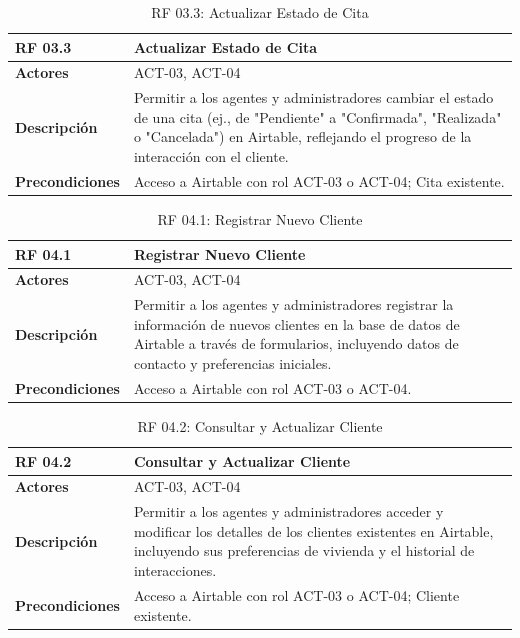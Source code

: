\begin{table}[H]
\centering
\begin{tabular}{|p{3cm}|p{10cm}|}
\hline
\rowcolor{tealblue}
\textbf{RF 03.3} & \textbf{Actualizar Estado de Cita} \\
\hline
\textbf{Actores} & ACT-03, ACT-04 \\
\hline
\textbf{Descripción} & Permitir a los agentes y administradores cambiar el estado de una cita (ej., de "Pendiente" a "Confirmada", "Realizada" o "Cancelada") en Airtable, reflejando el progreso de la interacción con el cliente. \\
\hline
\textbf{Precondiciones} & Acceso a Airtable con rol ACT-03 o ACT-04; Cita existente. \\
\hline
\end{tabular}
\caption{RF 03.3: Actualizar Estado de Cita}
\label{tab:rf_airtable_3_3}
\end{table}

\begin{table}[H]
\centering
\begin{tabular}{|p{3cm}|p{10cm}|}
\hline
\rowcolor{tealblue}
\textbf{RF 04.1} & \textbf{Registrar Nuevo Cliente} \\
\hline
\textbf{Actores} & ACT-03, ACT-04 \\
\hline
\textbf{Descripción} & Permitir a los agentes y administradores registrar la información de nuevos clientes en la base de datos de Airtable a través de formularios, incluyendo datos de contacto y preferencias iniciales. \\
\hline
\textbf{Precondiciones} & Acceso a Airtable con rol ACT-03 o ACT-04. \\
\hline
\end{tabular}
\caption{RF 04.1: Registrar Nuevo Cliente}
\label{tab:rf_airtable_4_1}
\end{table}

\begin{table}[H]
\centering
\begin{tabular}{|p{3cm}|p{10cm}|}
\hline
\rowcolor{tealblue}
\textbf{RF 04.2} & \textbf{Consultar y Actualizar Cliente} \\
\hline
\textbf{Actores} & ACT-03, ACT-04 \\
\hline
\textbf{Descripción} & Permitir a los agentes y administradores acceder y modificar los detalles de los clientes existentes en Airtable, incluyendo sus preferencias de vivienda y el historial de interacciones. \\
\hline
\textbf{Precondiciones} & Acceso a Airtable con rol ACT-03 o ACT-04; Cliente existente. \\
\hline
\end{tabular}
\caption{RF 04.2: Consultar y Actualizar Cliente}
\label{tab:rf_airtable_4_2}
\end{table}

